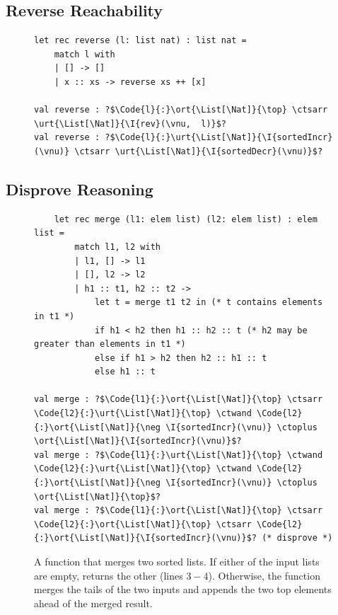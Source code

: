 \subsection{Reverse Reachability}

\begin{figure}[h!]
    \begin{verbatim}
let rec reverse (l: list nat) : list nat =
    match l with
    | [] -> []
    | x :: xs -> reverse xs ++ [x]

val reverse : ?$\Code{l}{:}\ort{\List[\Nat]}{\top} \ctsarr \urt{\List[\Nat]}{\I{rev}(\vnu,  l)}$?
val reverse : ?$\Code{l}{:}\urt{\List[\Nat]}{\I{sortedIncr}(\vnu)} \ctsarr \urt{\List[\Nat]}{\I{sortedDecr}(\vnu)}$?
    \end{verbatim}
\end{figure}


\subsection{Disprove Reasoning}


\begin{figure}[h!]
    \centering
\begin{verbatim}
    let rec merge (l1: elem list) (l2: elem list) : elem list =
        match l1, l2 with
        | l1, [] -> l1
        | [], l2 -> l2
        | h1 :: t1, h2 :: t2 ->
            let t = merge t1 t2 in (* t contains elements in t1 *)
            if h1 < h2 then h1 :: h2 :: t (* h2 may be greater than elements in t1 *)
            else if h1 > h2 then h2 :: h1 :: t
            else h1 :: t

val merge : ?$\Code{l1}{:}\ort{\List[\Nat]}{\top} \ctsarr \Code{l2}{:}\urt{\List[\Nat]}{\top} \ctwand \Code{l2}{:}\ort{\List[\Nat]}{\neg \I{sortedIncr}(\vnu)} \ctoplus \ort{\List[\Nat]}{\I{sortedIncr}(\vnu)}$?
val merge : ?$\Code{l1}{:}\urt{\List[\Nat]}{\top} \ctwand \Code{l2}{:}\urt{\List[\Nat]}{\top} \ctwand \Code{l2}{:}\ort{\List[\Nat]}{\neg \I{sortedIncr}(\vnu)} \ctoplus \ort{\List[\Nat]}{\top}$?
val merge : ?$\Code{l1}{:}\ort{\List[\Nat]}{\top} \ctsarr \Code{l2}{:}\ort{\List[\Nat]}{\top} \ctsarr \Code{l2}{:}\ort{\List[\Nat]}{\I{sortedIncr}(\vnu)}$? (* disprove *)
\end{verbatim}
\caption{A function that merges two sorted lists. If either of
the input lists are empty,  returns the other (lines
$3-4$). Otherwise, the function merges the tails of the two inputs and appends the two top elements ahead of the merged result. }
\label{fig:merge}
\end{figure}

